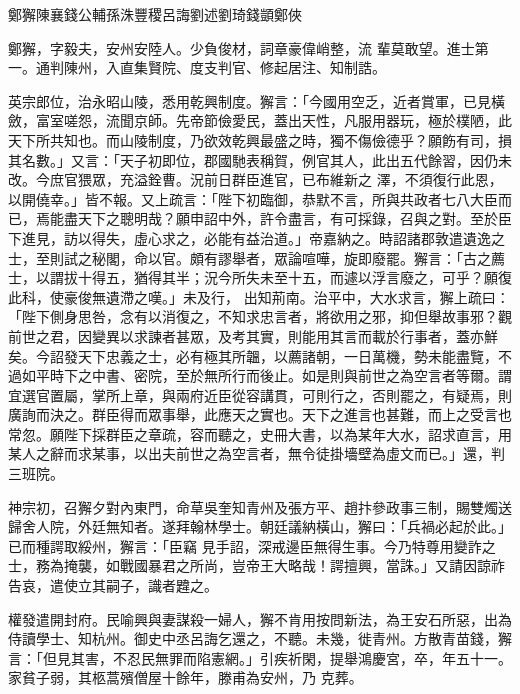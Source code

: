 
\begin{pinyinscope}

 鄭獬陳襄錢公輔孫洙豐稷呂誨劉述劉琦錢顗鄭俠



 鄭獬，字毅夫，安州安陸人。少負俊材，詞章豪偉峭整，流
 輩莫敢望。進士第一。通判陳州，入直集賢院、度支判官、修起居注、知制誥。



 英宗郎位，治永昭山陵，悉用乾興制度。獬言：「今國用空乏，近者賞軍，已見橫斂，富室嗟怨，流聞京師。先帝節儉愛民，蓋出天性，凡服用器玩，極於樸陋，此天下所共知也。而山陵制度，乃欲效乾興最盛之時，獨不傷儉德乎？願飭有司，損其名數。」又言：「天子初即位，郡國馳表稱賀，例官其人，此出五代餘習，因仍未改。今庶官猥眾，充溢銓曹。況前日群臣進官，已布維新之
 澤，不須復行此恩，以開僥幸。」皆不報。又上疏言：「陛下初臨御，恭默不言，所與共政者七八大臣而已，焉能盡天下之聰明哉？願申詔中外，許令盡言，有可採錄，召與之對。至於臣下進見，訪以得失，虛心求之，必能有益治道。」帝嘉納之。時詔諸郡敦遣遺逸之士，至則試之秘閣，命以官。頗有謬舉者，眾論喧嘩，旋即廢罷。獬言：「古之薦士，以謂拔十得五，猶得其半；況今所失未至十五，而遽以浮言廢之，可乎？願復此科，使豪俊無遺滯之嘆。」未及行，
 出知荊南。治平中，大水求言，獬上疏曰：「陛下側身思咎，念有以消復之，不知求忠言者，將欲用之邪，抑但舉故事邪？觀前世之君，因變異以求諫者甚眾，及考其實，則能用其言而載於行事者，蓋亦鮮矣。今詔發天下忠義之士，必有極其所韞，以薦諸朝，一日萬機，勢未能盡覽，不過如平時下之中書、密院，至於無所行而後止。如是則與前世之為空言者等爾。謂宜選官置屬，掌所上章，與兩府近臣從容講貫，可則行之，否則罷之，有疑焉，則
 廣詢而決之。群臣得而眾事舉，此應天之實也。天下之進言也甚難，而上之受言也常忽。願陛下採群臣之章疏，容而聽之，史冊大書，以為某年大水，詔求直言，用某人之辭而求某事，以出夫前世之為空言者，無令徒掛墻壁為虛文而已。」還，判三班院。



 神宗初，召獬夕對內東門，命草吳奎知青州及張方平、趙抃參政事三制，賜雙燭送歸舍人院，外廷無知者。遂拜翰林學士。朝廷議納橫山，獬曰：「兵禍必起於此。」已而種諤取綏州，獬言：「臣竊
 見手詔，深戒邊臣無得生事。今乃特尊用變詐之士，務為掩襲，如戰國暴君之所尚，豈帝王大略哉！諤擅興，當誅。」又請因諒祚告哀，遣使立其嗣子，識者韙之。



 權發遣開封府。民喻興與妻謀殺一婦人，獬不肯用按問新法，為王安石所惡，出為侍讀學士、知杭州。御史中丞呂誨乞還之，不聽。未幾，徙青州。方散青苗錢，獬言：「但見其害，不忍民無罪而陷憲網。」引疾祈閑，提舉鴻慶宮，卒，年五十一。家貧子弱，其柩蒿殯僧屋十餘年，滕甫為安州，乃
 克葬。




\end{pinyinscope}
